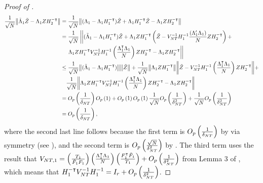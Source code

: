 \documentclass[12pt]{article}
\newcommand*{\tran}{\intercal}
\theoremstyle{plain}
\numberwithin{equation}{section}
\begin{document}
\begin{proof}[Proof of ]
\begin{align*}
\frac{1}{\sqrt{N}} \norm{
\tilde{\Lambda}_1 \tilde{Z} - \Lambda_1 Z H_2^{- \tran}
} 
&= \frac{1}{\sqrt{N}} \norm{
(\Lambda_1 - \Lambda_1 H_1^{-\tran}) \tilde{Z} + 
\Lambda_1 H_1^{-\tran}\tilde{Z} - 
\Lambda_1 Z H_2^{-\tran}
}
\\
&=
\frac{1}{\sqrt{N}} 
\left| \left| 
(\tilde{\Lambda}_1 - \Lambda_1 H_1^{- \tran}) \tilde{Z} + 
\Lambda_1 Z H_1^{-\tran} 
\left( \tilde{Z} - 
V_{NT}^{-1} H_1^{-1} \frac{(\Lambda_1' \Lambda_1)}{N} Z H_2^{-\tran}
\right)  + \right. \right. \\
&\quad
\left. \left. \Lambda_1 Z H_1^{- \tran} V_{NT}^{-1} H_1^{-1} \left( \frac{\Lambda_1^\tran \Lambda_1}{N} \right)  Z H_2^{-\tran} - \Lambda_1 Z H_2^{- \tran}
\right| \right| \\
&\leq 
\frac{1}{\sqrt{N}} 
\norm{
(\tilde{\Lambda}_1 - \Lambda_1 H_1^{- \tran})} \norm{ \tilde{Z} } +
\frac{1}{\sqrt{N}} \norm{ \Lambda_1 Z H_1^{- \tran} } \norm{\tilde{Z} - V_{NT}^{-1} H_1^{-1} \left( \frac{\Lambda_1^\tran \Lambda_1}{N} \right) Z H_2^{-\tran}} + \\
&\quad 
\frac{1}{\sqrt{N}} \norm{ \Lambda_1 Z H_1^{- \tran} V_{NT}^{-1} H_1^{-1} \left( \frac{\Lambda_1^\tran \Lambda_1}{N} \right)  Z H_2^{-\tran} - \Lambda_1 Z H_2^{- \tran} } \\
&= \Opdelta \Op{1} + \Op{1} \Op{1} \frac{1}{\sqrt{N}} \Opdeltasq + \frac{1}{\sqrt{N}} \Opdeltasq \\
&= \Opdelta,
\end{align*}
where the second last line follows because the first term is $O_p\left( \frac{1}{\delta_{NT}}\right)$ by  via symmetry (see \textcite{bai_simpler_2020}), and the second term is $O_p\left( \frac{\sqrt{N}}{\delta_{NT}^2}\right)$ by . The third term uses the result that $V_{NT, 1} = \left( \frac{T_1}{\tilde{F}_1 F_1}\right) \left( \frac{\Lambda_1^\tran \Lambda_1}{N}\right) \left( \frac{F_1^\tran \tilde{F}_1}{T_1}\right) + \Opdeltasq$ from Lemma 3 of \textcite{bai_simpler_2020}, which means that $H_1^{- \tran} V_{NT}^{-1} H_1^{-1} = I_r + \Opdeltasq$.
\end{proof}
\end{document}
